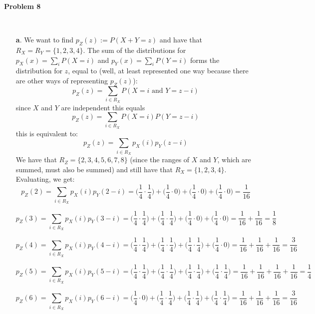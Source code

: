 \textbf{Problem 8}


\begin{solution}\ 
\begin{itemize}
 \item[\textbf{a}.] We want to find $p_Z(z) := P(X + Y = z)$ and have that $R_X = R_Y = \{1,2,3,4\}$. The sum of the distributions for $p_X(x) = \sum_i P(X = i)$ and $p_Y(x) = \sum_i P(Y = i)$ forms the distribution for $z$, equal to (well, at least represented one way because there are other ways of representing $p_Z(z)$):
 \[p_Z(z) = \sum_{i\in R_X} P(X = i \text{ and } Y = z - i)\]
 since $X$ and $Y$ are independent this equals
 \[p_Z(z) = \sum_{i\in R_X} P(X = i)P(Y = z - i)\]
 this is equivalent to:
 \[p_Z(z) = \sum_{i\in R_X} p_X(i)p_Y(z-i)\]
 We have that $R_Z = \{2,3,4,5,6,7,8\}$ (since the ranges of $X$ and $Y$, which are summed, must also be summed) and still have that $R_X=\{1,2,3,4\}$. Evaluating, we get:
\[p_Z(2) = \sum_{i\in R_X} p_X(i)p_Y(2-i) = \bigg(\frac{1}{4}\cdot\frac{1}{4}\bigg) + \bigg(\frac{1}{4}\cdot0\bigg) + \bigg(\frac{1}{4}\cdot0\bigg) + \bigg(\frac{1}{4}\cdot0\bigg)=\frac{1}{16}\]

\[p_Z(3) = \sum_{i\in R_X} p_X(i)p_Y(3-i) = \bigg(\frac{1}{4}\cdot\frac{1}{4}\bigg) + \bigg(\frac{1}{4}\cdot\frac{1}{4}\bigg) + \bigg(\frac{1}{4}\cdot0\bigg) + \bigg(\frac{1}{4}\cdot0\bigg)=\frac{1}{16}+\frac{1}{16}=\frac{1}{8}\]

\[p_Z(4) = \sum_{i\in R_X} p_X(i)p_Y(4-i) = \bigg(\frac{1}{4}\cdot\frac{1}{4}\bigg) + \bigg(\frac{1}{4}\cdot\frac{1}{4}\bigg) + \bigg(\frac{1}{4}\cdot\frac{1}{4}\bigg) + \bigg(\frac{1}{4}\cdot0\bigg)=\frac{1}{16}+\frac{1}{16}+\frac{1}{16}=\frac{3}{16}\] 

\[p_Z(5) = \sum_{i\in R_X} p_X(i)p_Y(5-i) = \bigg(\frac{1}{4}\cdot\frac{1}{4}\bigg) + \bigg(\frac{1}{4}\cdot\frac{1}{4}\bigg) + \bigg(\frac{1}{4}\cdot\frac{1}{4}\bigg) + \bigg(\frac{1}{4}\cdot\frac{1}{4}\bigg)=\frac{1}{16}+\frac{1}{16}+\frac{1}{16}+\frac{1}{16}=\frac{1}{4}\]

\[p_Z(6) = \sum_{i\in R_X} p_X(i)p_Y(6-i) = \bigg(\frac{1}{4}\cdot0\bigg) + \bigg(\frac{1}{4}\cdot\frac{1}{4}\bigg) + \bigg(\frac{1}{4}\cdot\frac{1}{4}\bigg) + \bigg(\frac{1}{4}\cdot\frac{1}{4}\bigg)=\frac{1}{16}+\frac{1}{16}+\frac{1}{16}=\frac{3}{16}\]


\end{itemize}
\end{solution}
